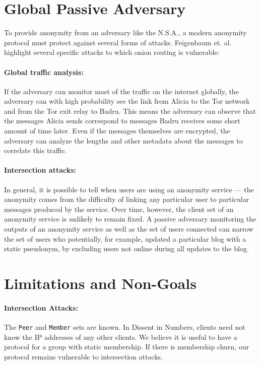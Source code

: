 \section{Global Passive Adversary}
  To provide anonymity from an adversary like the N.S.A., a modern anonymity
  protocol must protect against several forms of attacks. Feigenbaum et.
  al.\cite{feigenbaum_seeking_2013} highlight several specific attacks to
  which onion routing is vulnerable:
  \paragraph{Global traffic analysis:}
  If the adversary can monitor most of the traffic on the internet globally,
  the adversary can with high probability see the link from Alicia to the Tor
  network and from the Tor exit relay to Badru. This means the adversary can
  observe that the messages Alicia sends correspond to messages Badru receives
  some short amount of time later. Even if the messages themselves are
  encrypted, the adversary can analyze the lengths and other metadata about
  the messages to correlate this traffic.
  \paragraph{Intersection attacks:}
  In general, it is possible to tell when users are using an anonymity service
  --- the anonymity comes from the difficulty of linking any particular user
  to particular messages produced by the service. Over time, however, the
  client set of an anonymity service is unlikely to remain fixed. A passive
  adversary monitoring the outputs of an anonymity service as well as the set
  of users connected can narrow the set of users who potentially, for example,
  updated a particular blog with a static pseudonym, by excluding users  not
  online during all updates to the blog.

\section{Limitations and Non-Goals}
  \paragraph{Intersection Attacks:} The \texttt{Peer} and \texttt{Member} sets
  are known. In Dissent in Numbers, clients need not know the IP addresses of
  any other clients. We believe it is useful to have a protocol for a group with
  static membership.  If there is membership churn, our protocol remains
  vulnerable to intersection attacks.
